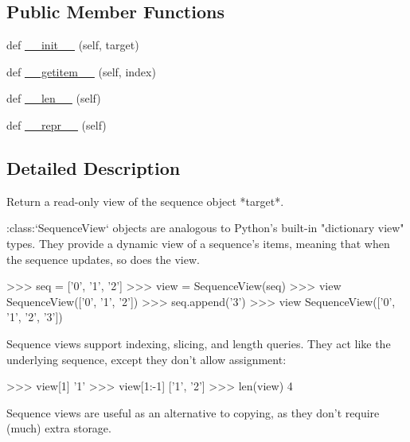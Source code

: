 \subsection*{Public Member Functions}
\begin{DoxyCompactItemize}
\item 
def \hyperlink{classsetuptools_1_1__vendor_1_1more__itertools_1_1more_1_1SequenceView_a2d15d82d3d05efa4f6a3d3121ba053fe}{\+\_\+\+\_\+init\+\_\+\+\_\+} (self, target)
\item 
def \hyperlink{classsetuptools_1_1__vendor_1_1more__itertools_1_1more_1_1SequenceView_ab7f4888d268a7c2b58b30f16f592d3ed}{\+\_\+\+\_\+getitem\+\_\+\+\_\+} (self, index)
\item 
def \hyperlink{classsetuptools_1_1__vendor_1_1more__itertools_1_1more_1_1SequenceView_aa90931089d55f5a627ef8ec4a2a27e6e}{\+\_\+\+\_\+len\+\_\+\+\_\+} (self)
\item 
def \hyperlink{classsetuptools_1_1__vendor_1_1more__itertools_1_1more_1_1SequenceView_a78fce898ff72d9333007cb8612165b94}{\+\_\+\+\_\+repr\+\_\+\+\_\+} (self)
\end{DoxyCompactItemize}


\subsection{Detailed Description}
\begin{DoxyVerb}Return a read-only view of the sequence object *target*.

:class:`SequenceView` objects are analogous to Python's built-in
"dictionary view" types. They provide a dynamic view of a sequence's items,
meaning that when the sequence updates, so does the view.

    >>> seq = ['0', '1', '2']
    >>> view = SequenceView(seq)
    >>> view
    SequenceView(['0', '1', '2'])
    >>> seq.append('3')
    >>> view
    SequenceView(['0', '1', '2', '3'])

Sequence views support indexing, slicing, and length queries. They act
like the underlying sequence, except they don't allow assignment:

    >>> view[1]
    '1'
    >>> view[1:-1]
    ['1', '2']
    >>> len(view)
    4

Sequence views are useful as an alternative to copying, as they don't
require (much) extra storage.\end{DoxyVerb}
 

